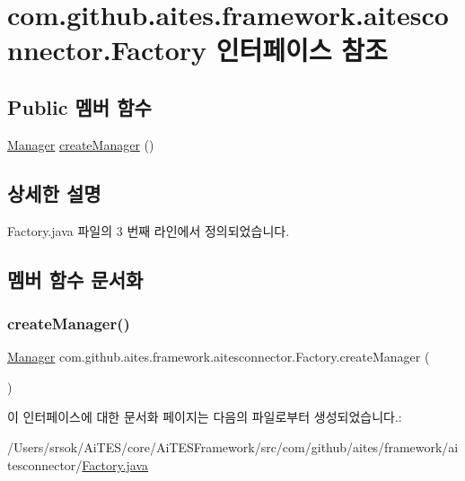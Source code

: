 \hypertarget{interfacecom_1_1github_1_1aites_1_1framework_1_1aitesconnector_1_1_factory}{}\section{com.\+github.\+aites.\+framework.\+aitesconnector.\+Factory 인터페이스 참조}
\label{interfacecom_1_1github_1_1aites_1_1framework_1_1aitesconnector_1_1_factory}
\subsection*{Public 멤버 함수}
\begin{DoxyCompactItemize}
\item 
\mbox{\hyperlink{classcom_1_1github_1_1aites_1_1framework_1_1aitesmanager_1_1_manager}{Manager}} \mbox{\hyperlink{interfacecom_1_1github_1_1aites_1_1framework_1_1aitesconnector_1_1_factory_ab9be8e3acd89ada6216b7c7f722b6105}{create\+Manager}} ()
\end{DoxyCompactItemize}


\subsection{상세한 설명}


Factory.\+java 파일의 3 번째 라인에서 정의되었습니다.



\subsection{멤버 함수 문서화}
\mbox{\label{interfacecom_1_1github_1_1aites_1_1framework_1_1aitesconnector_1_1_factory_ab9be8e3acd89ada6216b7c7f722b6105}} 
\subsubsection{\texorpdfstring{create\+Manager()}{createManager()}}
{\footnotesize\ttfamily \mbox{\hyperlink{classcom_1_1github_1_1aites_1_1framework_1_1aitesmanager_1_1_manager}{Manager}} com.\+github.\+aites.\+framework.\+aitesconnector.\+Factory.\+create\+Manager (\begin{DoxyParamCaption}{ }\end{DoxyParamCaption})}



이 인터페이스에 대한 문서화 페이지는 다음의 파일로부터 생성되었습니다.\+:\begin{DoxyCompactItemize}
\item 
/\+Users/srsok/\+Ai\+T\+E\+S/core/\+Ai\+T\+E\+S\+Framework/src/com/github/aites/framework/aitesconnector/\mbox{\hyperlink{_factory_8java}{Factory.\+java}}\end{DoxyCompactItemize}
